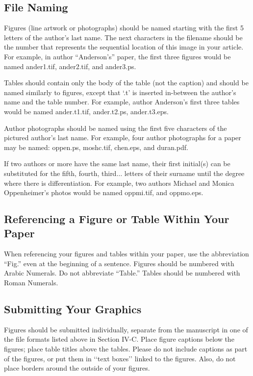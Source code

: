 \documentclass{ieeeaccess}
\begin{document}
\subsection{File Naming}
Figures (line artwork or photographs) should be named starting with the first 5
letters of the author's last name. The next characters in the filename should
be the number that represents the sequential location of this image in your
article. For example, in author ``Anderson's'' paper, the first three figures
would be named ander1.tif, ander2.tif, and ander3.ps.

Tables should contain only the body of the table (not the caption) and should
be named similarly to figures, except that `.t' is inserted in-between the
author's name and the table number. For example, author Anderson's first three
tables would be named ander.t1.tif, ander.t2.ps, ander.t3.eps.

Author photographs should be named using the first five characters of the
pictured author's last name. For example, four author photographs for a paper
may be named: oppen.ps, moshc.tif, chen.eps, and duran.pdf.

If two authors or more have the same last name, their first initial(s) can be
substituted for the fifth, fourth, third$\ldots$ letters of their surname until
the degree where there is differentiation. For example, two authors Michael and
Monica Oppenheimer's photos would be named oppmi.tif, and oppmo.eps.

\subsection{Referencing a Figure or Table Within Your Paper}
When referencing your figures and tables within your paper, use the
abbreviation ``Fig.'' even at the beginning of a sentence. Figures should be
numbered with Arabic Numerals. Do not abbreviate ``Table.'' Tables should be
numbered with Roman Numerals.

\subsection{Submitting Your Graphics}
Figures should be submitted individually, separate from the manuscript in one
of the file formats listed above in Section IV-C. Place figure captions below
the figures; place table titles above the tables. Please do not include
captions as part of the figures, or put them in ‘‘text boxes’’ linked to the
figures. Also, do not place borders around the outside of your figures.
\end{document}
